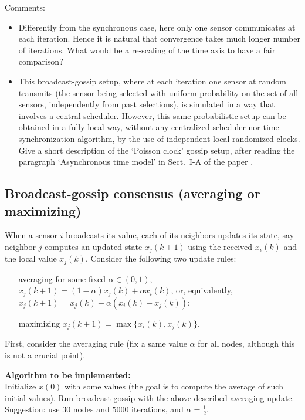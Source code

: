 \documentclass{article}
\begin{document}
Comments:
\begin{itemize}
\item Differently from the synchronous case, here only one sensor communicates at each iteration. Hence it is natural that convergence takes much longer number of iterations. What would be a re-scaling of the time axis to have a fair comparison?
\item This broadcast-gossip setup, where at each iteration one sensor at random transmits (the sensor being selected with uniform probability on the set of all sensors, independently from past selections), is simulated in a way that involves a central scheduler. However, this same probabilistic setup can be obtained in a fully local way, without any centralized scheduler nor time-synchronization algorithm, by the use of independent local randomized clocks. Give a short description of the `Poisson clock' gossip setup, after reading the paragraph `Asynchronous time model' in Sect.~I-A of the paper \cite{gossip-poisson}.
\end{itemize}


\subsection{Broadcast-gossip consensus (averaging or maximizing)}

When a sensor $i$ broadcasts its value, each of its neighbors updates its state, say neighbor $j$ computes an updated state $x_j(k+1)$ using the received $x_i(k)$ and the local value $x_j(k)$. Consider the following two update rules:
\begin{itemize}
\item[averaging] for some fixed $\alpha \in (0,1)$, $x_j(k+1) = (1- \alpha) x_j(k) + \alpha x_i(k) $, or, equivalently,
$x_j(k+1) = x_j(k) + \alpha (x_i(k)-x_j(k)) $;
\item[maximizing] $x_j(k+1) = \max\{x_i(k), x_j(k)\}$.
\end{itemize}

First, consider the averaging rule (fix a same value $\alpha$ for all nodes, although this is not a crucial point).

\textbf{Algorithm to be implemented:}\\
Initialize $x(0)$ with some values (the goal is to compute the average of such initial values).
Run broadcast gossip with the above-described averaging update.\\
Suggestion: use $30$ nodes and $5000$ iterations, and $\alpha = \frac{1}{2}$.
\end{document}
